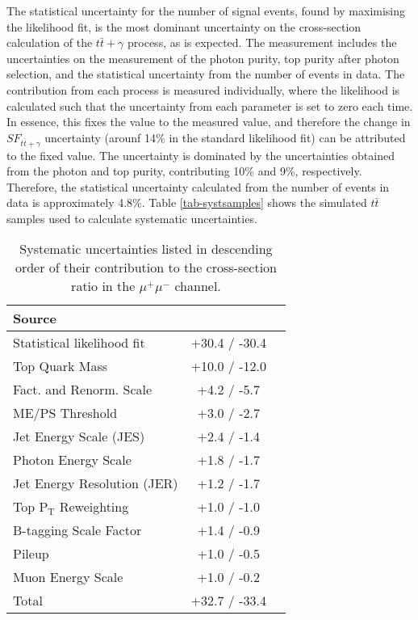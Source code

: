 The statistical uncertainty for the number of signal events, found by maximising the likelihood fit, is the most dominant uncertainty on the cross-section calculation of the $t\bar{t}+\gamma$ process, as is expected. The measurement includes the uncertainties on the measurement of the photon purity, top purity after photon selection, and the statistical uncertainty from the number of events in data. The contribution from each process is measured individually, where the likelihood is calculated such that the uncertainty from each parameter is set to zero each time. In essence, this fixes the value to the measured value, and therefore the change in $SF_{t\bar{t}+\gamma}$ uncertainty (arounf 14\% in the standard likelihood fit) can be attributed to the fixed value. The uncertainty is dominated by the uncertainties obtained from the photon and top purity, contributing 10\% and 9\%, respectively. Therefore, the statistical uncertainty calculated from the number of events in data is approximately 4.8\%. Table \ref{tab-systsamples} shows the simulated $t\bar{t}$ samples used to calculate systematic uncertainties.

\begin{table}[h!] 
\centering
\begin{tabular}{|l|c|c|}
\hline
\textbf{Source} & {\textbf{Ratio Change (\%)} \\
\hline
Statistical likelihood fit & +30.4 / -30.4 \\
Top Quark Mass & +10.0 / -12.0 \\
Fact. and Renorm. Scale & +4.2 / -5.7 \\
ME/PS Threshold & +3.0 / -2.7\\
Jet Energy Scale (JES) & +2.4 / -1.4\\
Photon Energy Scale & +1.8 / -1.7\\
Jet Energy Resolution (JER) & +1.2 / -1.7\\
Top P$_{\text{T}}$ Reweighting & +1.0 / -1.0\\
B-tagging Scale Factor & +1.4 / -0.9\\
Pileup & +1.0 / -0.5\\
Muon Energy Scale & +1.0 / -0.2\\
\hline
Total & +32.7 / -33.4 \\
\hline
\end{tabular} 
\caption{Systematic uncertainties listed in descending order of their contribution to the cross-section ratio in the $\mu^+\mu^-$ channel.}
\label{tab-systuncertsMuMu}
\end{table}

